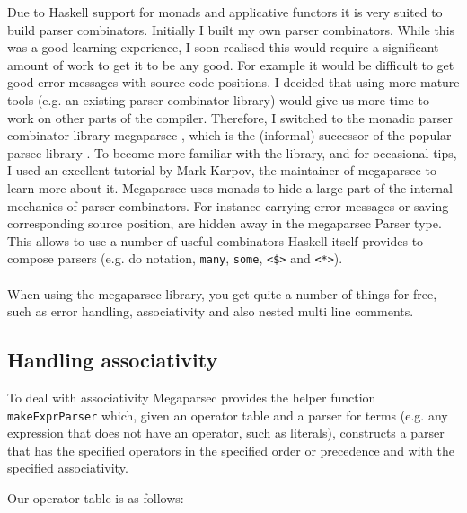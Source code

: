 \documentclass{report}
\begin{document}
Due to Haskell support for monads and applicative functors it is very suited to build parser combinators. Initially I built my own parser combinators. While this was a good learning experience, I soon realised this would require a significant amount of work to get it to be any good. For example it would be difficult to get good error messages with source code positions. I decided that using
more mature tools (e.g. an existing parser combinator library) would give us more time to work on other parts of the compiler. Therefore, I switched to the monadic parser combinator library megaparsec \cite{megaparsec}, which is the (informal) successor of the popular parsec library \cite{parsec}. To become more familiar with the library, and for occasional tips, I used an excellent tutorial \cite{megaparsec-tutorial} by Mark Karpov, the maintainer of megaparsec to learn more about it.
Megaparsec uses monads to hide a large part of the internal mechanics of parser combinators. For instance carrying error messages or saving corresponding source position, are hidden away in the megaparsec Parser type. This allows to use a number of useful combinators Haskell itself provides to compose parsers (e.g. do notation, 
\texttt{many}, \texttt{some}, \texttt{<\$>} and \texttt{<*>}).
\\\\
When using the megaparsec library, you get quite a number of things for free, such as error handling, associativity and also nested multi line comments.

\subsection{Handling associativity}

 To deal with associativity Megaparsec provides the helper function \texttt{makeExprParser} which,
given an operator table and a parser for terms (e.g. any expression that does not have an operator, such as literals), constructs a parser that has the specified operators in the specified order or precedence and with the specified associativity. 

Our operator table is as follows:
\end{document}
